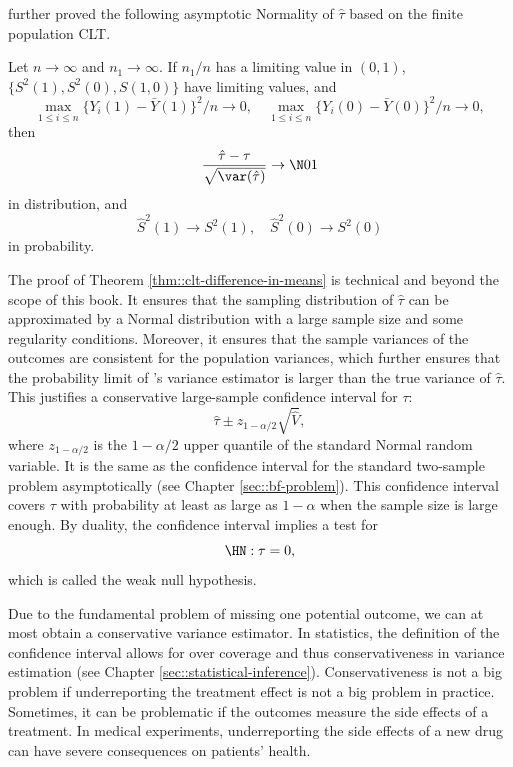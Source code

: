  
 
 
 


\citet[][Theorem 5 and Proposition 3]{li2017general} further proved the following asymptotic Normality of $\hat{\tau}$ based on the finite population CLT.
\begin{theorem}
\label{thm::clt-difference-in-means}
Let $n\rightarrow \infty$ and $n_1 \rightarrow \infty$. 
If $n_1/n$ has a limiting value in $(0,1)$,  $\{S^2(1), S^2(0), S(1,0)\}$ have limiting values, and 
$$  
\max_{1\leq i \leq n}\{ Y_i(1) - \bar{Y}(1) \}^2/n \rightarrow 0, \quad 
\max_{1\leq i \leq n}\{ Y_i(0) - \bar{Y}(0) \}^2/n \rightarrow 0,
$$
then 
$$
\frac{   \hat{\tau} - \tau }{  \sqrt{ \var(\hat{\tau}) } } \rightarrow \N01
$$
in distribution, and
$$
\hat{S}^2(1) \rightarrow S^2(1),\quad 
\hat{S}^2(0) \rightarrow S^2(0)
$$
in probability. 
\end{theorem}


The proof of  Theorem \ref{thm::clt-difference-in-means} is technical and beyond the scope of this book. It ensures that the sampling distribution of $\hat{\tau} $ can be approximated by a Normal distribution with a large sample size and some regularity conditions. Moreover, it ensures that the sample variances of the outcomes are consistent for the population variances, which further ensures that the probability limit of \cite{Neyman:1923}'s variance estimator is larger than the true variance of $\hat{\tau} $. This justifies a conservative large-sample confidence interval for $\tau$: 
$$
\hat{\tau} \pm z_{1-\alpha/2} \sqrt{  \hat{V}  },
$$
where $z_{1-\alpha/2}$ is the $1-\alpha/2$ upper quantile of the standard Normal random variable. It is the same as the confidence interval for the standard two-sample problem asymptotically (see Chapter \ref{sec::bf-problem}). This confidence interval covers $\tau$ with probability at least as large as $1-\alpha$ when the sample size is large enough. By duality, the confidence interval implies a test for 
$$
\HN: \tau = 0,
$$
which is called the weak null hypothesis. 



Due to the fundamental problem of missing one potential outcome, we can at most obtain a conservative variance estimator. In statistics, the definition of the confidence interval allows for over coverage and thus conservativeness in variance estimation (see Chapter \ref{sec::statistical-inference}).  Conservativeness is not a big problem if underreporting the treatment effect is not a big problem in practice. Sometimes, it can be problematic if the outcomes measure the side effects of a treatment. In medical experiments, underreporting the side effects of a new drug can have severe consequences on patients' health. 
 
